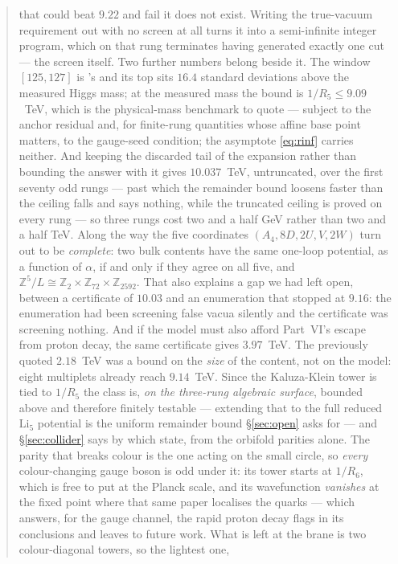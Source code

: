 \documentclass[11pt,a4paper]{article}
\newcommand{\ZZ}{\mathbb{Z}}
\begin{document}
\begin{abstract}
that could beat $9.22$ and fail it does not exist. Writing the true-vacuum requirement out with no
screen at all turns it into a semi-infinite integer program, which on that rung terminates having
generated exactly one cut --- the screen itself. Two further numbers belong beside it. The window
$[125,127]$ is \cite{KM25}'s and its top sits $16.4$ standard deviations above the measured Higgs
mass; at the measured mass the bound is $1/R_5\le9.09$~TeV, which is the physical-mass benchmark to
quote --- subject to the anchor residual and, for finite-rung quantities whose affine base point
matters, to the gauge-seed condition; the asymptote \eqref{eq:rinf} carries neither. And keeping the discarded tail of the expansion
rather than bounding the answer with it gives $10.037$~TeV, untruncated, over the first seventy
odd rungs --- past which the remainder bound loosens faster than the ceiling falls and says
nothing, while the truncated ceiling is proved on every rung ---
so three rungs cost two and a half GeV rather than two and a half TeV. Along the way the five
coordinates $(A_4,8D,2U,V,2W)$ turn out to be \emph{complete}: two bulk contents have the same
one-loop potential, as a function of $\alpha$, if and only if they agree on all five, and
$\ZZ^5/L\cong\ZZ_2\times\ZZ_{72}\times\ZZ_{2592}$. That also explains a gap we had left open, between a certificate of
$10.03$ and an enumeration that stopped at $9.16$: the enumeration had been screening false vacua
silently and the certificate was screening nothing. And if the model must also afford Part~VI's escape from proton decay, the
same certificate gives $3.97$~TeV. The previously quoted $2.18$~TeV was a bound on the \emph{size} of the content,
not on the model: eight multiplets already reach $9.14$~TeV. Since the Kaluza-Klein tower is tied to
$1/R_5$ the class is, \emph{on the three-rung algebraic surface}, bounded above and therefore
finitely testable --- extending that to the full reduced $\mathrm{Li}_5$ potential is the uniform
remainder bound \S\ref{sec:open} asks for --- and
\S\ref{sec:collider} says by which state, from the orbifold parities alone. The parity that breaks
colour is the one acting on the small circle, so \emph{every} colour-changing gauge boson is odd
under it: its tower starts at $1/R_6$, which \cite{KM25} is free to put at the Planck scale, and its
wavefunction \emph{vanishes} at the fixed point where that same paper localises the quarks --- which
answers, for the gauge channel, the rapid proton decay \cite{KM25} flags in its conclusions and
leaves to future work. What is left at the brane is two colour-diagonal towers, so the lightest one,

\end{abstract}
\end{document}
